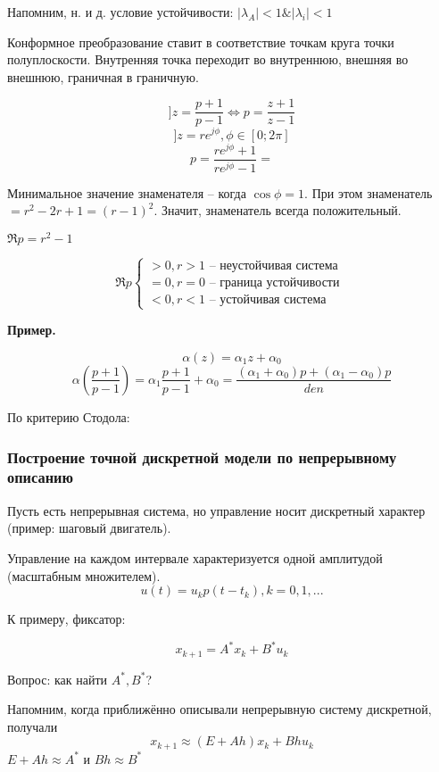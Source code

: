 \documentclass[main.tex]{subfiles}
\begin{document}
Напомним, н. и д. условие устойчивости: $ |\lambda_A| < 1 \& |\lambda_i| < 1 $


Конформное преобразование ставит в соответствие точкам круга точки полуплоскости.
Внутренняя точка переходит во внутреннюю, внешняя во внешнюю, граничная в граничную.

\[ ] z = \frac{p+1}{p-1} \Leftrightarrow p = \frac{z+1}{z-1} \]
\[ ] z = r e^{j \phi}, \phi \in [0; 2 \pi] \]
\[ p = \frac{r e^{j \phi} + 1}{r e^{j \phi} - 1} =  \] %

Минимальное значение знаменателя -- когда $ \cos \phi = 1 $.
При этом знаменатель $ = r^2 - 2r + 1 = (r-1)^2 $.
Значит, знаменатель всегда положительный.

$ \Re p = r^2 - 1 $

$$ \Re p \begin{cases}
> 0, r > 1 \text{ -- неустойчивая система } \\
= 0, r = 0 \text{ -- граница устойчивости } \\
< 0, r < 1 \text{ -- устойчивая система }
\end{cases} $$


\textbf{ Пример. }

\[ \alpha(z) = \alpha_1 z + \alpha_0 \]
\[ \alpha \left( \frac{p+1}{p-1} \right) = \alpha_1 \frac{ p + 1 }{ p - 1}  + \alpha_0 = \frac{ (\alpha_1 + \alpha_0) p + (\alpha_1 - \alpha_0) p  }{den} \] %

По критерию Стодола: %

\subsubsection{ Построение точной дискретной модели по непрерывному описанию }

Пусть есть непрерывная система, но управление носит дискретный характер (пример: шаговый двигатель).


Управление на каждом интервале характеризуется одной амплитудой (масштабным множителем).
\[ u(t) = u_k p(t-t_k), k = 0, 1, ... \]

К примеру, фиксатор:

\[ x_{k+1} = A^* x_k + B^* u_k \]

Вопрос: как найти $ A^*, B^* $?

Напомним, когда приближённо описывали непрерывную систему дискретной, получали
\[ x_{k+1} \approx (E + Ah) x_k + Bh u_k \]
$ E + Ah \approx A^* $ и $ Bh \approx B^* $
\end{document}
